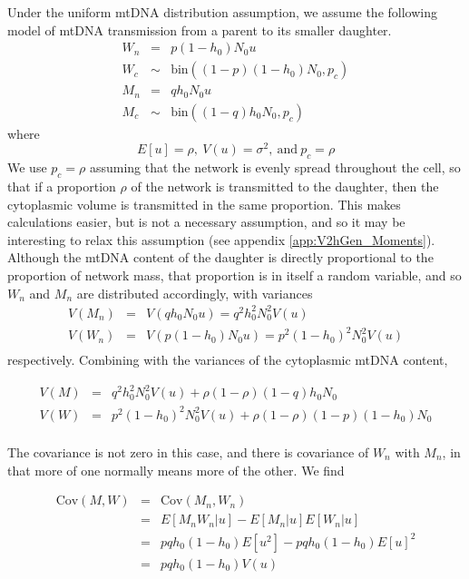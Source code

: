 \documentclass{article}
\begin{document}
Under the uniform mtDNA distribution assumption, we assume the following model of mtDNA transmission from a parent to its smaller daughter.
\begin{eqnarray}
         W_n &=& p(1-h_0)N_0u \label{eq:App_UniformNetModel} \\
         W_c &\sim& \mathrm{bin}\left((1-p)(1-h_0)N_0,p_c\right) \\
         M_n &=& qh_0N_0u \\
         M_c &\sim& \mathrm{bin}\left((1-q)h_0N_0,p_c\right)
\end{eqnarray}
where
\begin{equation}
E[u]=\rho,\ V(u) = \sigma^2,\ \mathrm{and\ } p_c=\rho
\end{equation}
We use $p_c=\rho$ assuming that the network is evenly spread throughout the cell, so that if a proportion $\rho$ of the network is transmitted to the daughter, then the cytoplasmic volume is transmitted in the same proportion. This makes calculations easier, but is not a necessary assumption, and so it may be interesting to relax this assumption (see appendix \ref{app:V2hGen_Moments}). Although the mtDNA content of the daughter is directly proportional to the proportion of network mass, that proportion is in itself a random variable, and so $W_n$ and $M_n$ are distributed accordingly, with variances
    \begin{eqnarray}
     V(M_n) &= &V(qh_0N_0u)=q^2h_0^2N_0^2V(u)\\
     V(W_n) &= &V(p(1-h_0)N_0u)=p^2(1-h_0)^2N_0^2V(u)\\
    \end{eqnarray}
respectively. Combining with the variances of the cytoplasmic mtDNA content, 

    \begin{eqnarray}
     V(M) &= &q^2h_0^2N_0^2V(u)+\rho(1-\rho)(1-q)h_0N_0\\
     V(W) &= &p^2(1-h_0)^2N_0^2V(u)+\rho(1-\rho)(1-p)(1-h_0)N_0\\
    \end{eqnarray}

The covariance is not zero in this case, and there is covariance of $W_n$ with $M_n$, in that more of one normally means more of the other. We find

\begin{eqnarray}
    \mathrm{Cov}(M,W) & =&\mathrm{Cov}(M_n,W_n)\\
        & = &E[M_nW_n|u]-E[M_n|u]E[W_n|u]\\
        & = &pqh_0(1-h_0)E[u^2]-pqh_0(1-h_0)E[u]^2\\
        & = &pqh_0(1-h_0)V(u)
    \end{eqnarray}
\end{document}

